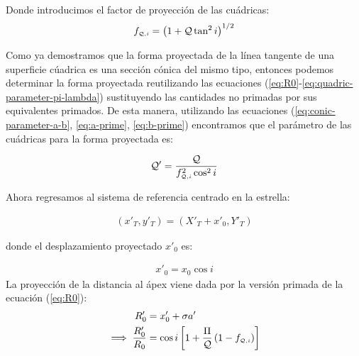 Donde introducimos el factor de proyección de las cuádricas:
\begin{align}
  f_{\scriptscriptstyle \mathcal{Q}, i} = \left(1 + \mathcal{Q}\tan^2i\right)^{1/2}
\end{align}


Como ya demostramos que la forma proyectada de la línea tangente de una superficie cúadrica es una sección cónica del mismo tipo, entonces podemos determinar la forma proyectada reutilizando las ecuaciones (\ref{eq:R0}-\ref{eq:quadric-parameter-pi-lambda}) sustituyendo las cantidades no primadas por sus equivalentes primados. De esta manera, utilizando las ecuaciones (\ref{eq:conic-parameter-a-b}, \ref{eq:a-prime}, \ref{eq:b-prime}) encontramos que el parámetro de las cuádricas para la forma proyectada es:

\begin{align}
  \mathcal{Q}' = \frac{\mathcal{Q}}{f_{\scriptscriptstyle \mathcal{Q}, i}^2 \cos^2 i}\label{eq:Q-prime}
\end{align}

Ahora regresamos al sistema de referencia centrado en la estrella:

\begin{align}
  (x'_T, y'_T) = (X'_T + x'_0, Y'_T)
\end{align}

donde el desplazamiento proyectado $x'_0$ es:

\begin{align}
  x'_0 = x_0\cos i
\end{align}
La proyección de la distancia al ápex viene dada por la versión primada de la ecuación (\ref{eq:R0}):
\begin{align}
  R'_0 &=  x'_0 + \sigma a'\\
  \implies \frac{R'_0}{R_0} &= \cos i\left[1 + \frac{\Pi}{\mathcal{Q}}\left(1 - f_{\scriptscriptstyle \mathcal{Q}, i}\right)\right]
\end{align}

